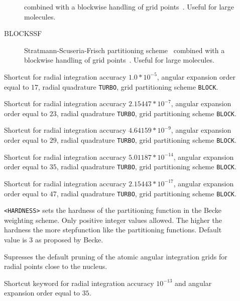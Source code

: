 \begin{description}
\begin{description}
combined with a blockwise handling of grid points~\cite{dft-int:dalton-blocked}. Useful for large molecules.
\item[BLOCKSSF] Stratmann-Scuseria-Frisch partitioning scheme~\cite{dft-int:ssf}
combined with a blockwise handling of grid points~\cite{dft-int:dalton-blocked}. Useful for large molecules.
\end{description}
\item[\Key{GRID1}]
Shortcut for radial integration accuracy $1.0*10^{-5}$, 
angular expansion order equal to $17$, 
radial quadrature \verb|TURBO|, 
grid partitioning scheme \verb|BLOCK|.
\item[\Key{GRID2}]
Shortcut for radial integration accuracy $2.15447*10^{-7}$, 
angular expansion order equal to $23$, 
radial quadrature \verb|TURBO|, 
grid partitioning scheme \verb|BLOCK|.
\item[\Key{GRID3}]
Shortcut for radial integration accuracy $4.64159*10^{-9}$, 
angular expansion order equal to $29$, 
radial quadrature \verb|TURBO|, 
grid partitioning scheme \verb|BLOCK|.
\item[\Key{GRID4}]
Shortcut for radial integration accuracy $5.01187*10^{-14}$,
angular expansion order equal to $35$,
radial quadrature \verb|TURBO|,
grid partitioning scheme \verb|BLOCK|.
\item[\Key{GRID5}]
Shortcut for radial integration accuracy $2.15443*10^{-17}$,
angular expansion order equal to $47$,
radial quadrature \verb|TURBO|,
grid partitioning scheme \verb|BLOCK|.
\item[\Key{HARDNESS}] \verb||\newline
\verb|<HARDNESS>|\newline
sets the hardness of the partitioning function in the Becke weighting scheme. Only positive integer values allowed. 
The higher the hardness the more stepfunction like the partitioning functions. 
Default value is $3$ as proposed by Becke.~\cite{dft-int:becke}
\item[\Key{NOPRUN}]
Supresses the default pruning of the atomic angular integration grids for radial points close to the nucleus. 
\item[\Key{NORMAL}]
Shortcut keyword for radial integration accuracy $10^{-13}$ and angular expansion order equal to $35$.
\item[\Key{RADINT}] \verb||\newline

\end{description}
